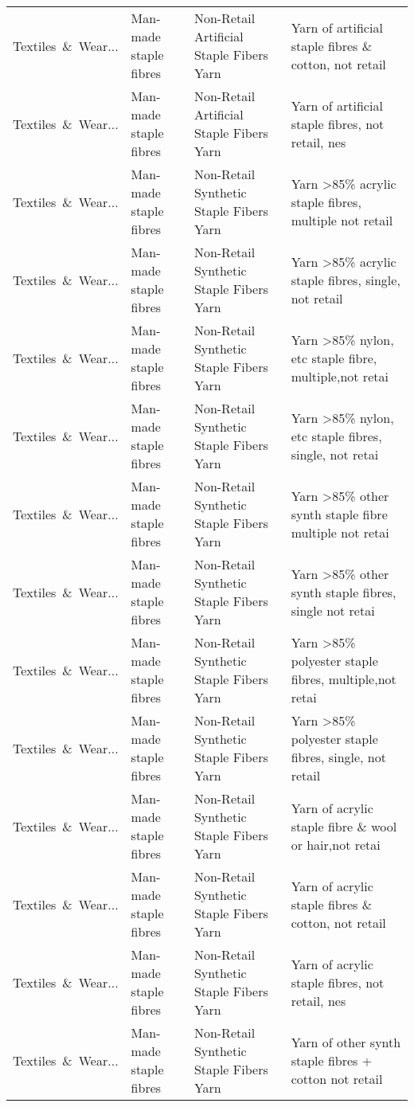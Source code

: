 \begin{appendices}
\begin{xltabular}{\textwidth}{|p{0.10\textwidth}|p{0.25\textwidth}|p{0.24\textwidth}|p{0.31\textwidth}|}
Textiles\ \&\ Wear... & Man-made staple fibres & Non-Retail Artificial Staple Fibers Yarn & Yarn of artificial staple fibres \& cotton, not retail \\
Textiles\ \&\ Wear... & Man-made staple fibres & Non-Retail Artificial Staple Fibers Yarn & Yarn of artificial staple fibres, not retail, nes \\
Textiles\ \&\ Wear... & Man-made staple fibres & Non-Retail Synthetic Staple Fibers Yarn & Yarn >85\% acrylic staple fibres, multiple  not retail \\
Textiles\ \&\ Wear... & Man-made staple fibres & Non-Retail Synthetic Staple Fibers Yarn & Yarn >85\% acrylic staple fibres, single, not retail \\
Textiles\ \&\ Wear... & Man-made staple fibres & Non-Retail Synthetic Staple Fibers Yarn & Yarn >85\% nylon, etc staple fibre, multiple,not retai \\
Textiles\ \&\ Wear... & Man-made staple fibres & Non-Retail Synthetic Staple Fibers Yarn & Yarn >85\% nylon, etc staple fibres, single, not retai \\
Textiles\ \&\ Wear... & Man-made staple fibres & Non-Retail Synthetic Staple Fibers Yarn & Yarn >85\% other synth staple fibre multiple not retai \\
Textiles\ \&\ Wear... & Man-made staple fibres & Non-Retail Synthetic Staple Fibers Yarn & Yarn >85\% other synth staple fibres, single not retai \\
Textiles\ \&\ Wear... & Man-made staple fibres & Non-Retail Synthetic Staple Fibers Yarn & Yarn >85\% polyester staple fibres, multiple,not retai \\
Textiles\ \&\ Wear... & Man-made staple fibres & Non-Retail Synthetic Staple Fibers Yarn & Yarn >85\% polyester staple fibres, single, not retail \\
Textiles\ \&\ Wear... & Man-made staple fibres & Non-Retail Synthetic Staple Fibers Yarn & Yarn of acrylic staple fibre \& wool or hair,not retai \\
Textiles\ \&\ Wear... & Man-made staple fibres & Non-Retail Synthetic Staple Fibers Yarn & Yarn of acrylic staple fibres \& cotton, not retail \\
Textiles\ \&\ Wear... & Man-made staple fibres & Non-Retail Synthetic Staple Fibers Yarn & Yarn of acrylic staple fibres, not retail, nes \\
Textiles\ \&\ Wear... & Man-made staple fibres & Non-Retail Synthetic Staple Fibers Yarn & Yarn of other synth staple fibres + cotton not retail \\

\end{xltabular}
\end{appendices}

